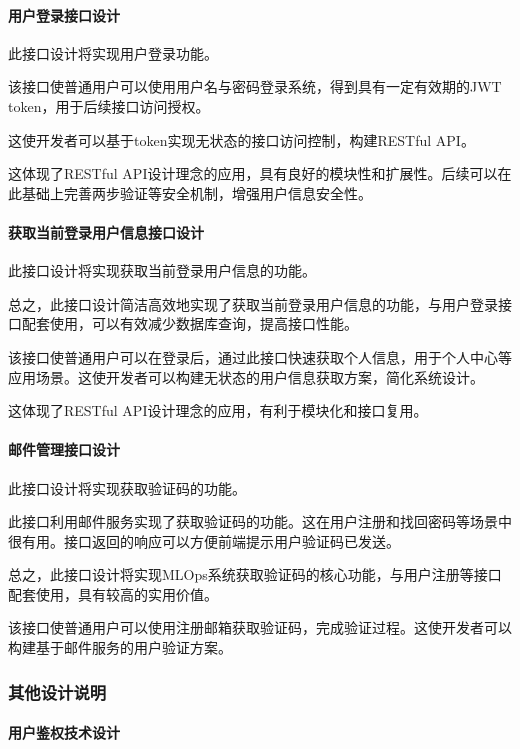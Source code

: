 \documentclass{HDU-Bachelor-Thesis}
\begin{document}
\paragraph{用户登录接口设计}

此接口设计将实现用户登录功能。

该接口使普通用户可以使用用户名与密码登录系统，得到具有一定有效期的JWT token，用于后续接口访问授权。

这使开发者可以基于token实现无状态的接口访问控制，构建RESTful API。

这体现了RESTful API设计理念的应用，具有良好的模块性和扩展性。后续可以在此基础上完善两步验证等安全机制，增强用户信息安全性。

\paragraph{获取当前登录用户信息接口设计}

此接口设计将实现获取当前登录用户信息的功能。

总之，此接口设计简洁高效地实现了获取当前登录用户信息的功能，与用户登录接口配套使用，可以有效减少数据库查询，提高接口性能。

该接口使普通用户可以在登录后，通过此接口快速获取个人信息，用于个人中心等应用场景。这使开发者可以构建无状态的用户信息获取方案，简化系统设计。

这体现了RESTful API设计理念的应用，有利于模块化和接口复用。

\paragraph{邮件管理接口设计}

此接口设计将实现获取验证码的功能。

此接口利用邮件服务实现了获取验证码的功能。这在用户注册和找回密码等场景中很有用。接口返回的响应可以方便前端提示用户验证码已发送。

总之，此接口设计将实现MLOps系统获取验证码的核心功能，与用户注册等接口配套使用，具有较高的实用价值。

该接口使普通用户可以使用注册邮箱获取验证码，完成验证过程。这使开发者可以构建基于邮件服务的用户验证方案。

\subsubsection{其他设计说明}
\paragraph{用户鉴权技术设计}
\end{document}
